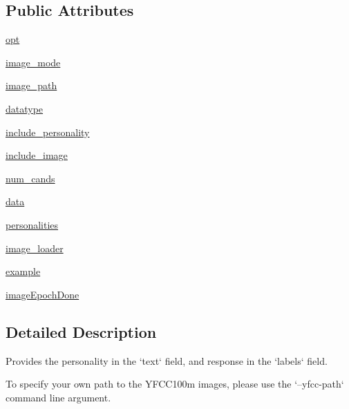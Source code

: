 \subsection*{Public Attributes}
\begin{DoxyCompactItemize}
\item 
\hyperlink{classparlai_1_1tasks_1_1image__chat_1_1agents_1_1ImageChatTeacher_a64b34fbd89f984698409e85197fc6327}{opt}
\item 
\hyperlink{classparlai_1_1tasks_1_1image__chat_1_1agents_1_1ImageChatTeacher_ae8c27447869ad8645b6572994c930a43}{image\+\_\+mode}
\item 
\hyperlink{classparlai_1_1tasks_1_1image__chat_1_1agents_1_1ImageChatTeacher_a76af41b0787179f96a515407deb9a26a}{image\+\_\+path}
\item 
\hyperlink{classparlai_1_1tasks_1_1image__chat_1_1agents_1_1ImageChatTeacher_a3233a84a5603090a6c04cd5e7240c084}{datatype}
\item 
\hyperlink{classparlai_1_1tasks_1_1image__chat_1_1agents_1_1ImageChatTeacher_aa917cf2e0f8b30c042a1d149aed6d16f}{include\+\_\+personality}
\item 
\hyperlink{classparlai_1_1tasks_1_1image__chat_1_1agents_1_1ImageChatTeacher_af20d97f7deded47d8c35ed6cc205d261}{include\+\_\+image}
\item 
\hyperlink{classparlai_1_1tasks_1_1image__chat_1_1agents_1_1ImageChatTeacher_a4cf47d0dacf67e9112521761a8d26318}{num\+\_\+cands}
\item 
\hyperlink{classparlai_1_1tasks_1_1image__chat_1_1agents_1_1ImageChatTeacher_a64d66688a29851c48e88f4c284ab57b6}{data}
\item 
\hyperlink{classparlai_1_1tasks_1_1image__chat_1_1agents_1_1ImageChatTeacher_a3ba9be694ed33f16d9f3b4c6cc3f6a13}{personalities}
\item 
\hyperlink{classparlai_1_1tasks_1_1image__chat_1_1agents_1_1ImageChatTeacher_a9fc07cfbee29595e6b1b52b0855c4888}{image\+\_\+loader}
\item 
\hyperlink{classparlai_1_1tasks_1_1image__chat_1_1agents_1_1ImageChatTeacher_a14105336d54e1f2662fdee38f9e5037e}{example}
\item 
\hyperlink{classparlai_1_1tasks_1_1image__chat_1_1agents_1_1ImageChatTeacher_a081df82b58bd3170bf575070902a4bfb}{image\+Epoch\+Done}
\end{DoxyCompactItemize}


\subsection{Detailed Description}
\begin{DoxyVerb}Provides the personality in the `text` field, and response in the `labels` field.

To specify your own path to the YFCC100m images, please use the `--yfcc-path`
command line argument.
\end{DoxyVerb}
 

